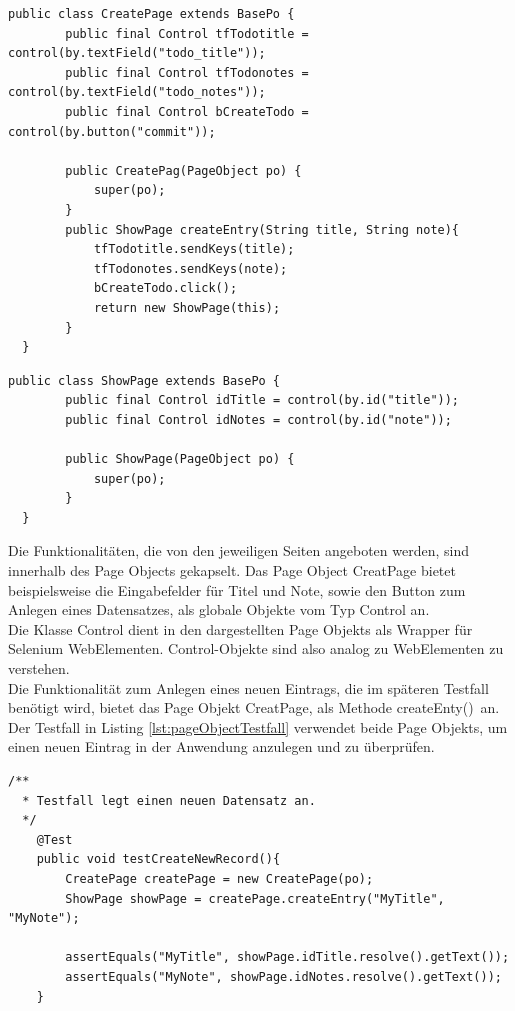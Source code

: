 \begin{lstlisting}[caption={Page Object CreatePage},label={lst:poCreatePage}]
  public class CreatePage extends BasePo {
		public final Control tfTodotitle = control(by.textField("todo_title"));
		public final Control tfTodonotes = control(by.textField("todo_notes"));
		public final Control bCreateTodo = control(by.button("commit"));
		
		public CreatePag(PageObject po) {
			super(po);
		}
		public ShowPage createEntry(String title, String note){
			tfTodotitle.sendKeys(title);
			tfTodonotes.sendKeys(note);
			bCreateTodo.click();
			return new ShowPage(this);
		}
  }
\end{lstlisting}  
\begin{lstlisting}[caption={Page Object ShowPage},label={lst:poShowPage}]  
  public class ShowPage extends BasePo {
		public final Control idTitle = control(by.id("title"));
		public final Control idNotes = control(by.id("note"));

		public ShowPage(PageObject po) {
			super(po);
		}
  }
\end{lstlisting}

Die Funktionalitäten, die von den jeweiligen Seiten angeboten werden, sind innerhalb des Page Objects gekapselt. Das Page Object CreatPage bietet beispielsweise die Eingabefelder für Titel und Note, sowie den Button zum Anlegen eines Datensatzes, als globale Objekte vom Typ Control an.\\
Die Klasse Control dient in den dargestellten Page Objekts als Wrapper für Selenium WebElementen. Control-Objekte sind also analog zu WebElementen zu verstehen.\\
Die Funktionalität zum Anlegen eines neuen Eintrags, die im späteren Testfall benötigt wird, bietet das Page Objekt CreatPage, als Methode \grq createEnty()\grq\ an.\\

Der Testfall in Listing \ref{lst:pageObjectTestfall} verwendet beide Page Objekts, um einen neuen Eintrag in der Anwendung anzulegen und zu überprüfen.\\


\begin{lstlisting}[caption={Page Object Testfall},label={lst:pageObjectTestfall}]  
  /**
  * Testfall legt einen neuen Datensatz an.
  */
 	@Test
	public void testCreateNewRecord(){
		CreatePage createPage = new CreatePage(po);
		ShowPage showPage = createPage.createEntry("MyTitle", "MyNote");

		assertEquals("MyTitle", showPage.idTitle.resolve().getText());
		assertEquals("MyNote", showPage.idNotes.resolve().getText());
	}

\end{lstlisting}

